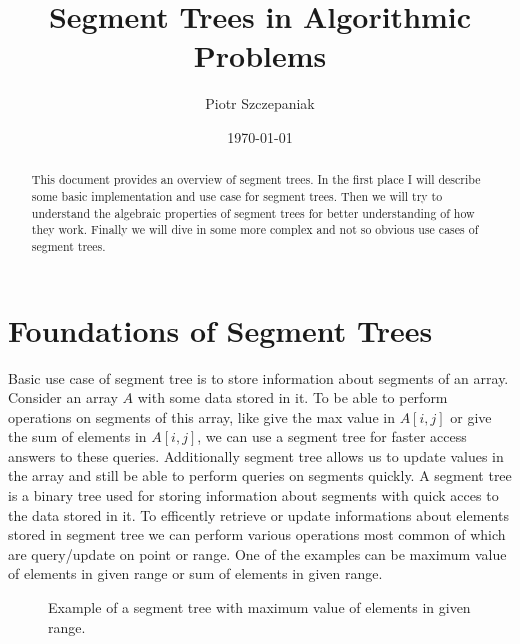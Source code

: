 \documentclass{article}
\title{Segment Trees in Algorithmic Problems}
\author{Piotr Szczepaniak}
\date{\today}
\begin{document}
\maketitle

\tableofcontents

\begin{abstract}
This document provides an overview of segment trees. In the first place
I will describe some basic implementation and use case for segment trees.
Then we will try to understand the algebraic properties of segment trees for
better understanding of how they work. Finally we will dive in some more complex and not so obvious
use cases of segment trees.
\end{abstract}

\section{Foundations of Segment Trees}
Basic use case of segment tree is to store information about segments of an array.
Consider an array \(A\) with some data stored in it. To be able to perform operations on segments of this array, like
give the max value in \(A[i, j]\) or give the sum of elements in \(A[i, j]\), we can use a segment tree for faster
access answers to these queries. Additionally segment tree allows us to update values in the array and still be able to perform queries on segments quickly.
A segment tree is a binary tree used for storing information about segments with quick acces to the data stored in it. 
To efficently retrieve or update informations about elements stored 
in segment tree we can perform various operations most common of which are
query/update on point or range.
One of the examples can be maximum value of 
elements in given range or sum of elements in given range.

\begin{figure}[H]
    \centering
    
    \caption{Example of a segment tree with maximum value of elements in given range.}
    \label{fig:segment_tree_1}
\end{figure}
\end{document}
